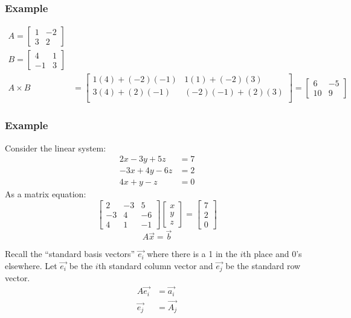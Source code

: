 \documentclass[letterpaper, 12pt]{math}
\begin{document}
\subsubsection*{Example}
\begin{align*}
  A = \begin{bmatrix}1 & -2 \\ 3 & 2\end{bmatrix} \\
  B = \begin{bmatrix}4 & 1 \\ -1 & 3\end{bmatrix} \\
  A\times B &= \begin{bmatrix}
    1(4)+(-2)(-1) & 1(1)+(-2)(3) \\
    3(4)+(2)(-1) & (-2)(-1)+(2)(3) \\
  \end{bmatrix} = \begin{bmatrix}6 & -5 \\ 10 & 9\end{bmatrix}
\end{align*}

\subsubsection*{Example}
Consider the linear system:
\begin{align*}
  2x-3y+5z &= 7 \\
  -3x+4y-6z &= 2 \\
  4x+y-z &= 0
\end{align*}
As a matrix equation:
\[ \begin{bmatrix}
  2 & -3 & 5 \\
  -3 & 4 & -6 \\
  4 & 1 & -1
\end{bmatrix}\begin{bmatrix}
  x \\ y \\ z
\end{bmatrix} = \begin{bmatrix}
  7 \\ 2 \\ 0
\end{bmatrix} \]
\[ A\vec{x} = \vec{b} \]

Recall the ``standard basis vectors'' \( \vec{e_i} \) where there is a 1 in
the \( i \)th place and 0's elsewhere. Let \( \vec{e_i} \) be the \( i \)th
standard column vector and \( \vec{e_j} \) be the standard row vector.
\begin{align*}
  A\vec{e_i} &= \vec{a_i} \\
  \vec{e_j} &= \vec{A_j}
\end{align*}
\end{document}
